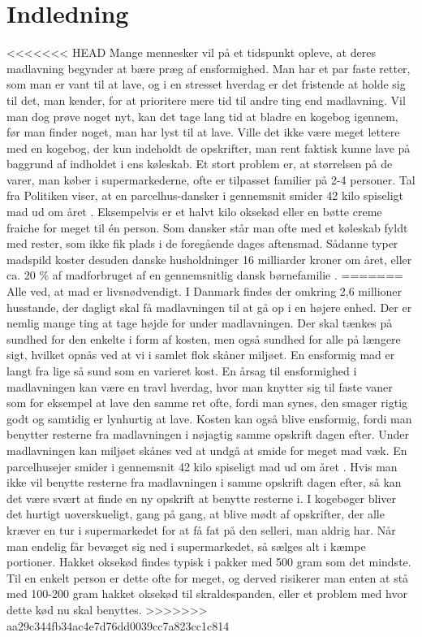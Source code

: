\chapter{Indledning}
\label{chap:indledning}

<<<<<<< HEAD
Mange mennesker vil på et tidspunkt opleve, at deres madlavning begynder at bære præg af ensformighed. Man har et par faste retter, som man er vant til at lave, og i en stresset hverdag er det fristende at holde sig til det, man kender, for at prioritere mere tid til andre ting end madlavning. Vil man dog prøve noget nyt, kan det tage lang tid at bladre en kogebog igennem, før man finder noget, man har lyst til at lave. Ville det ikke være meget lettere med en kogebog, der kun indeholdt de opskrifter, man rent faktisk kunne lave på baggrund af indholdet i ens køleskab. Et stort problem er, at størrelsen på de varer, man køber i supermarkederne, ofte er tilpasset familier på 2-4 personer. Tal fra Politiken viser, at en parcelhus-dansker i gennemsnit smider 42 kilo spiseligt mad ud om året \cite{madspildpol}. Eksempelvis er et halvt kilo oksekød eller en bøtte creme fraiche for meget til én person. Som dansker står man ofte med et køleskab fyldt med rester, som ikke fik plads i de foregående dages aftensmad. Sådanne typer madspild koster desuden danske husholdninger 16 milliarder kroner om året, eller ca. 20 \% af madforbruget af en gennemsnitlig dansk børnefamilie \cite{madspild16}. 
=======
Alle ved, at mad er livsnødvendigt. I Danmark findes der omkring 2,6 millioner husstande\cite{husstande}, der dagligt skal få madlavningen til at gå op i en højere enhed. Der er nemlig mange ting at tage højde for under madlavningen. Der skal tænkes på sundhed for den enkelte i form af kosten, men også sundhed for alle på længere sigt, hvilket opnås ved at vi i samlet flok skåner miljøet.
En ensformig mad er langt fra lige så sund som en varieret kost. En årsag til ensformighed i madlavningen kan være en travl hverdag, hvor man knytter sig til faste vaner som for eksempel at lave den samme ret ofte, fordi man synes, den smager rigtig godt og samtidig er lynhurtig at lave. Kosten kan også blive ensformig, fordi man benytter resterne fra madlavningen i nøjagtig samme opskrift dagen efter.
Under madlavningen kan miljøet skånes ved at undgå at smide for meget mad væk. En parcelhusejer smider i gennemsnit 42 kilo spiseligt mad ud om året \cite{madspildpol}. Hvis man ikke vil benytte resterne fra madlavningen i samme opskrift dagen efter, så kan det være svært at finde en ny opskrift at benytte resterne i. I kogebøger bliver det hurtigt uoverskueligt, gang på gang, at blive mødt af opskrifter, der alle kræver en tur i supermarkedet for at få fat på den selleri, man aldrig har. Når man endelig får bevæget sig ned i supermarkedet, så sælges alt i kæmpe portioner. Hakket oksekød findes typisk i pakker med 500 gram som det mindste. Til en enkelt person er dette ofte for meget, og derved risikerer man enten at stå med 100-200 gram hakket oksekød til skraldespanden, eller et problem med hvor dette kød nu skal benyttes.
>>>>>>> aa29c344fb34ac4e7d76dd0039cc7a823cc1c814


